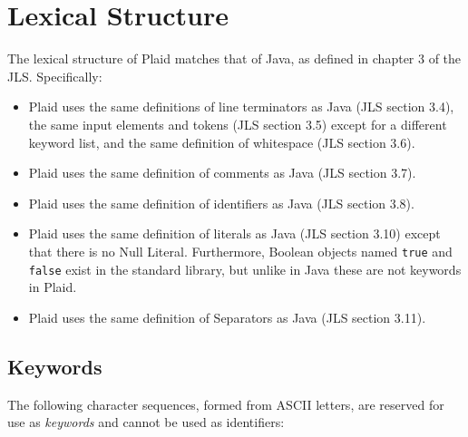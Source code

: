 \section{Lexical Structure}

The lexical structure of Plaid matches that of Java, as defined in
chapter 3 of the JLS.  Specifically:

\begin{itemize}



\item Plaid uses the same definitions of line terminators as Java (JLS
  section 3.4), the same input elements and tokens (JLS section 3.5)
  except for a different keyword list, and the same definition of
  whitespace (JLS section 3.6).

\item Plaid uses the same definition of comments as Java (JLS section 3.7).

\item Plaid uses the same definition of identifiers as Java (JLS section 3.8).

\item Plaid uses the same definition of literals as Java (JLS section
  3.10) except that there is no Null Literal.  Furthermore, Boolean
  objects named \texttt{true} and \texttt{false} exist in the standard
  library, but unlike in Java these are not keywords in Plaid.

\item Plaid uses the same definition of Separators as Java (JLS section 3.11).

\end{itemize}


\subsection{Keywords}

The following character sequences, formed from ASCII letters, are reserved
for use as \textit{keywords} and cannot be used as identifiers:

